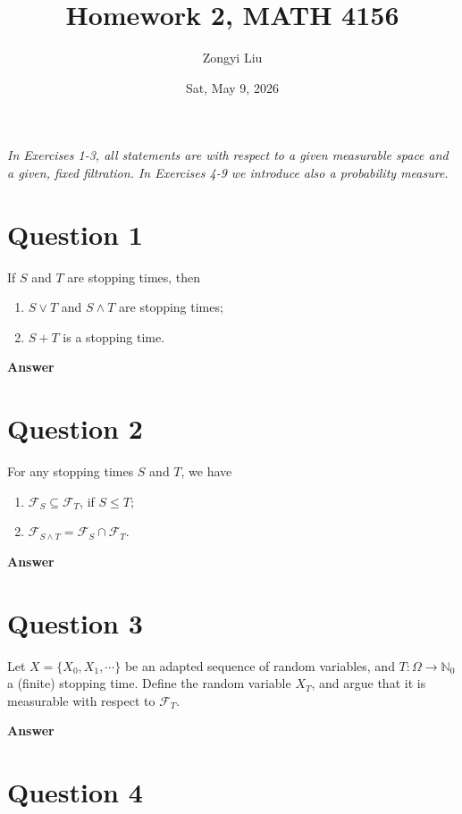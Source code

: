 \documentclass[letterpaper]{article}
\title{Homework 2, MATH 4156}
\author{Zongyi Liu}
\date{Sat, May 9, 2026}
\begin{document}
		\maketitle
		
		\textit{In Exercises 1-3, all statements are with respect to a given measurable space and a given, fixed filtration. In Exercises 4-9 we introduce also a probability measure.
		}
		\section{Question 1}
		{\color{deepred} }
		
		If $S$ and $T$ are stopping times, then
		\begin{enumerate}
			\item[(i)] $S \vee T$ and $S \wedge T$ are stopping times;
			\item[(ii)] $S + T$ is a stopping time.
		\end{enumerate}
		
		\textbf{Answer}
		
		\clearpage
		
		\section{Question 2}
		
		For any stopping times $S$ and $T$, we have
		\begin{enumerate}
			\item[(i)] $\mathcal{F}_S \subseteq \mathcal{F}_T$, if $S \leq T$;
			\item[(ii)] $\mathcal{F}_{S \wedge T} = \mathcal{F}_S \cap \mathcal{F}_T$.
		\end{enumerate}
		
		\textbf{Answer}
		
		\clearpage
		
		\section{Question 3}
		
		Let $X = \{X_0, X_1, \cdots\}$ be an adapted sequence of random variables, and $T : \Omega \to \mathbb{N}_0$ a (finite) stopping time. Define the random variable $X_T$, and argue that it is measurable with respect to $\mathcal{F}_T$.
		
		
		\textbf{Answer}
		
		\clearpage
		
		\section{Question 4}
		
\end{document}
